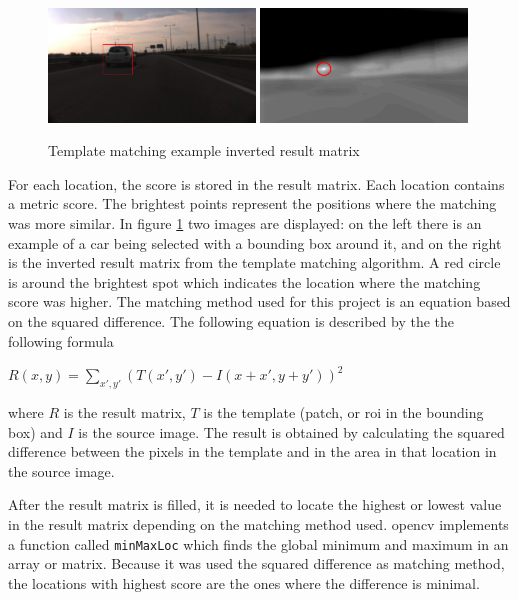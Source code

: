 \begin{figure}[htp]
	
	\centering
	\includegraphics[width=0.49\textwidth]{caplabel/imgs/resultmat.png}\hfill
	\includegraphics[width=0.49\textwidth]{caplabel/imgs/resultmat2.png}
	
	\caption{Template matching example inverted result matrix}
	\label{fig:resultmat}
	
\end{figure}

For each location, the score is stored in the result matrix. Each location contains a metric score. The brightest points represent the positions where the matching was more similar. In figure \ref{fig:resultmat} two images are displayed: on the left there is an example of a car being selected with a bounding box around it, and on the right is the inverted result matrix from the template matching algorithm. A red circle is around the brightest spot which indicates the location where the matching score was higher. The matching method used for this project is an equation based on the squared difference. The following equation is described by the the following formula

\begin{center}
	$R(x,y) = \sum_{x',y'}(T(x',y')-I(x+x',y+y'))^2$
\end{center}

where $R$ is the result matrix, $T$ is the template (patch, or \gls{roi} in the bounding box) and $I$ is the source image. The result is obtained by calculating the squared difference between the pixels in the template and in the area in that location in the source image.  

After the result matrix is filled, it is needed to locate the highest or lowest value in the result matrix depending on the matching method used. \gls{opencv} implements a function called \texttt{minMaxLoc} which finds the global minimum and maximum in an array or matrix. Because it was used the squared difference as matching method, the locations with highest score are the ones where the difference is minimal.

